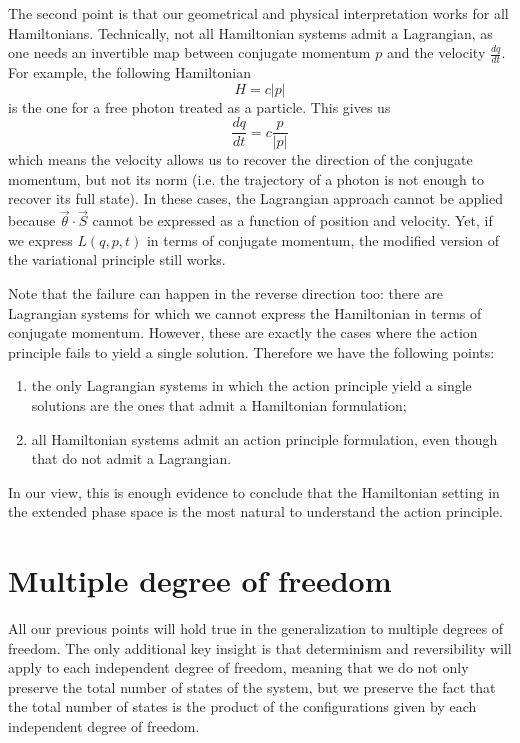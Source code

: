 \documentclass[10pt,twocolumn, nofootinbib]{revtex4-2}
\begin{document}
The second point is that our geometrical and physical interpretation works for all Hamiltonians. Technically, not all Hamiltonian systems admit a Lagrangian, as one needs an invertible map between conjugate momentum $p$ and the velocity $\frac{dq}{dt}$. For example, the following Hamiltonian
\begin{equation}
	H = c |p|
\end{equation}
is the one for a free photon treated as a particle. This gives us
\begin{equation}
	\frac{dq}{dt}= c \frac{p}{|p|}
\end{equation}
which means the velocity allows us to recover the direction of the conjugate momentum, but not its norm (i.e. the trajectory of a photon is not enough to recover its full state). In these cases, the Lagrangian approach cannot be applied because $\vec{\theta} \cdot \vec{S}$ cannot be expressed as a function of position and velocity. Yet, if we express $L(q,p,t)$ in terms of conjugate momentum, the modified version of the variational principle still works.

Note that the failure can happen in the reverse direction too: there are Lagrangian systems for which we cannot express the Hamiltonian in terms of conjugate momentum. However, these are exactly the cases where the action principle fails to yield a single solution. Therefore we have the following points:
\begin{enumerate}
	\item the only Lagrangian systems in which the action principle yield a single solutions are the ones that admit a Hamiltonian formulation;
	\item all Hamiltonian systems admit an action principle formulation, even though that do not admit a Lagrangian.
\end{enumerate}

In our view, this is enough evidence to conclude that the Hamiltonian setting in the extended phase space is the most natural to understand the action principle.

\section{Multiple degree of freedom}

All our previous points will hold true in the generalization to multiple degrees of freedom. The only additional key insight is that determinism and reversibility will apply to each independent degree of freedom, meaning that we do not only preserve the total number of states of the system, but we preserve the fact that the total number of states is the product of the configurations given by each independent degree of freedom.
\end{document}
